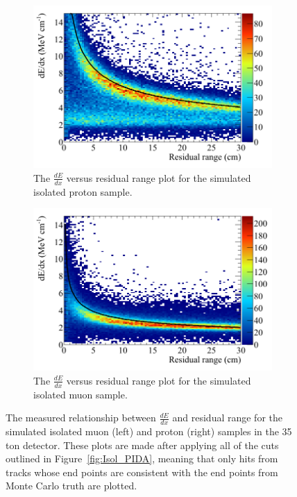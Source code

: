 \begin{figure}
  \centering
  \begin{subfigure}{0.48\textwidth}
        \centering
        \includegraphics[width=\textwidth]{IsolatedProtons_500V_Dec16_Proton_dEdx}
        \caption{The $\frac{dE}{dx}$ versus residual range plot for the simulated isolated proton sample.}
        \label{fig:Isol_dEdx_Proton}
  \end{subfigure}%
  \hspace{0.03\textwidth}%
  \begin{subfigure}{0.48\textwidth}
        \centering
        \includegraphics[width=\textwidth]{IsolatedMuons_500V_Dec16_Muon_dEdx}
        \caption{The $\frac{dE}{dx}$ versus residual range plot for the simulated isolated muon sample.}
        \label{fig:Isol_dEdx_Muon}
  \end{subfigure}
  \caption[The $\frac{dE}{dx}$ versus residual range plot for the simulated isolated muon and proton samples in the 35 ton detector.]
          {The measured relationship between $\frac{dE}{dx}$ and residual range for the simulated isolated muon (left) and proton (right) samples in the 35 ton detector. These plots are made after applying all of the cuts outlined in Figure~\ref{fig:Isol_PIDA}, meaning that only hits from tracks whose end points are consistent with the end points from Monte Carlo truth are plotted.}
  \label{fig:Isol_dEdx}
\end{figure}

